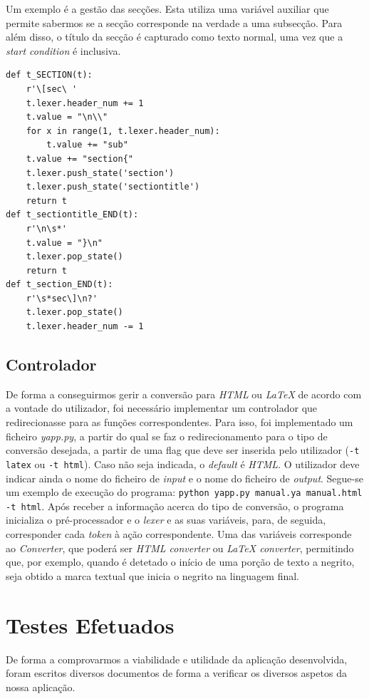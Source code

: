 \documentclass{article}
\begin{document}
 Um exemplo é a gestão das secções. Esta utiliza uma variável auxiliar que permite sabermos se a secção corresponde na verdade a uma subsecção. Para além disso, o título da secção é capturado como texto normal, uma vez que a \textit{start condition} é inclusiva.\\
 \begin{verbatim}
def t_SECTION(t):
    r'\[sec\ '
    t.lexer.header_num += 1
    t.value = "\n\\"
    for x in range(1, t.lexer.header_num):
        t.value += "sub"
    t.value += "section{"
    t.lexer.push_state('section')
    t.lexer.push_state('sectiontitle')
    return t
def t_sectiontitle_END(t):
    r'\n\s*'
    t.value = "}\n"
    t.lexer.pop_state()
    return t
def t_section_END(t):
    r'\s*sec\]\n?'
    t.lexer.pop_state()
    t.lexer.header_num -= 1
\end{verbatim}
 \subsection{Controlador}
De forma a conseguirmos gerir a conversão para \textit{HTML} ou \textit{LaTeX} de acordo com a vontade do utilizador, foi necessário implementar um controlador que redirecionasse para as funções correspondentes. Para isso, foi implementado um ficheiro \textit{yapp.py}, a partir do qual se faz o redirecionamento para o tipo de conversão desejada, a partir de uma flag que deve ser inserida pelo utilizador (\texttt{-t latex} ou \texttt{-t html}). Caso não seja indicada, o \textit{default} é \textit{HTML}. O utilizador deve indicar ainda o nome do ficheiro de \textit{input} e o nome do ficheiro de \textit{output}. Segue-se um exemplo de execução do programa: \texttt{python yapp.py manual.ya manual.html -t html}. Após receber a informação acerca do tipo de conversão, o programa inicializa o pré-processador e o \textit{lexer} e as suas variáveis, para, de seguida, corresponder cada \textit{token} à ação correspondente. Uma das variáveis corresponde ao \textit{Converter}, que poderá ser \textit{HTML converter} ou \textit{LaTeX converter}, permitindo que, por exemplo, quando é detetado o início de uma porção de texto a negrito, seja obtido a marca textual que inicia o negrito na linguagem final.\newpage
\section{Testes Efetuados}
De forma a comprovarmos a viabilidade e utilidade da aplicação desenvolvida, foram escritos diversos documentos de forma a verificar os diversos aspetos da nossa aplicação.\\
\end{document}
